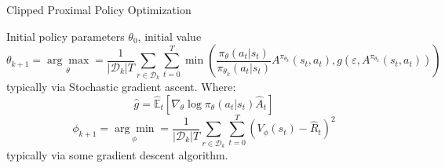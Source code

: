 \begin{algorithm}[H]
    \caption{Clipped Proximal Policy Optimization}
    \label{alg:ppo}
    \begin{algorithmic}[1]
        \REQUIRE Initial policy parameters $\theta _0$, initial value
        $$
            \theta _{k + 1} = \underset{\theta}{\arg\max} = \frac{1}{|\mathcal{D} _k|T} \sum _{r \in \mathcal{D} _k} \sum _{t = 0} ^{T} \min \left( \frac{\pi _{\theta} (a _t | s _t)}{\pi _{\theta_k} (a _t | s _t)} A ^{\pi _{\theta_k}} (s _t, a _t), g(\varepsilon, A ^{\pi _{\theta_k}}(s _t, a _t)) \right)
        $$
        typically via Stochastic gradient ascent. Where:
        $$
            \hat{g} = \hat{\mathbb{E}} _t \left[\nabla _{\theta}\log\pi _{\theta}(a _t | s _t) \hat{A} _t\right]
        $$
        $$
            \phi _{k + 1} = \underset{\phi}{\arg\min} = \frac{1}{|\mathcal{D} _k|T} \sum _{r \in \mathcal{D} _k} \sum _{t = 0} ^{T} \left(V _{\phi}(s _t) - \hat{R} _t \right)^2
        $$
        typically via some gradient descent algorithm.
        \ENDFOR
    \end{algorithmic}
\end{algorithm}